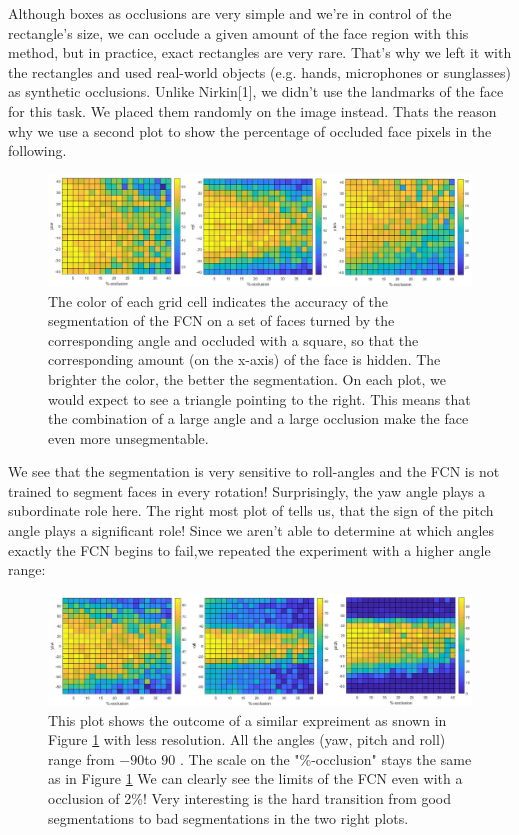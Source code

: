 Although boxes as occlusions are very simple and we're in control of the rectangle's size, we can occlude a given amount of the face region with this method, but in practice, exact rectangles are very rare. That's why we left it with the rectangles and used real-world objects (e.g. hands, microphones or sunglasses) as synthetic occlusions. Unlike Nirkin[1], we didn't use the landmarks of the face for this task. We placed them randomly on the image instead. Thats the reason why we use a second plot to show the percentage of occluded face pixels in the following.

\begin{figure}
	\centering
	\includegraphics[width=\textwidth]{Figures/occVal_angles.png}
	\caption{The color of each grid cell indicates the accuracy of the segmentation of the FCN on a set of faces turned by the corresponding angle and occluded with a square, so that the corresponding amount (on the x-axis) of the face is hidden. The brighter the color, the better the segmentation. On each plot, we would expect to see a triangle pointing to the right. This means that the combination of a large angle and a large occlusion make the face even more unsegmentable.}
	\label{fig:occVal40}
\end{figure}

We see that the segmentation is very sensitive to roll-angles and the FCN is not trained to segment faces in every rotation! Surprisingly, the yaw angle plays a subordinate role here. The right most plot of  tells us, that the sign of the pitch angle plays a significant role! Since we aren't able to determine at which angles exactly the FCN begins to fail,we repeated the experiment with a higher angle range:\\

\begin{figure}[b]
	\centering
	\includegraphics[width=\textwidth]{Figures/occVal_angles_90.png}
	\caption{This plot shows the outcome of a similar expreiment as snown in Figure \ref{fig:occVal40} with less resolution. All the angles (yaw, pitch and roll) range from $-90$\textdegree to $90$ \textdegree. The scale on the "\%-occlusion" stays the same as in Figure \ref{fig:occVal40} We can clearly see the limits of the FCN even with a occlusion of 2\%! Very interesting is the hard transition from good segmentations to bad segmentations in the two right plots.}
	\label{fig:occVal90}
\end{figure}


